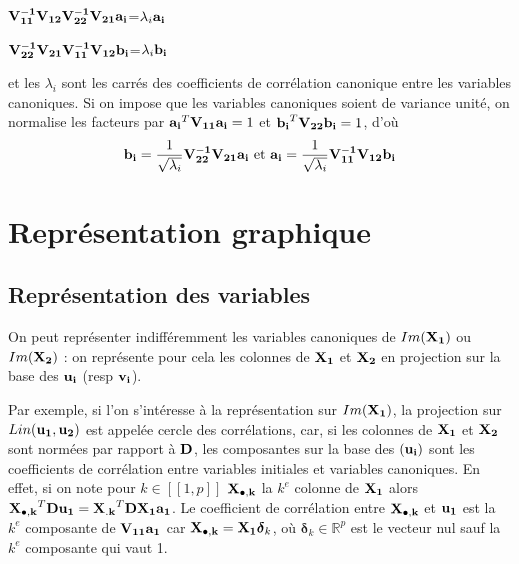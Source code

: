 \documentclass[letterpaper,10pt,french]{sphinxmanual}
\begin{document}
\sphinxAtStartPar
\( {\bf V_{11}^{-1}}{\bf V_{12}}{\bf V_{22}^{-1}}{\bf V_{21}}{\bf a_i}\)=\(\lambda_i {\bf a_i}\)

\sphinxAtStartPar
\( {\bf V_{22}^{-1}}{\bf V_{21}}{\bf V_{11}^{-1}}{\bf V_{12}}{\bf b_i}\)=\(\lambda_i {\bf b_i}\)

\sphinxAtStartPar
et les \(\lambda_i\) sont les carrés des coefficients de corrélation canonique entre les variables canoniques. Si on impose que les variables canoniques soient de variance unité, on normalise les facteurs par \({\bf a_i}^T{\bf V_{11}}{\bf a_i}=1\) et  \({\bf b_i}^T{\bf V_{22}}{\bf b_i}=1\), d’où
\begin{equation*}
\begin{split}{\bf b_i}=\frac{1}{\sqrt{\lambda_i}}{\bf V_{22}^{-1}}{\bf V_{21}}{\bf a_i}\textrm{  et } {\bf a_i}=\frac{1}{\sqrt{\lambda_i}}{\bf V_{11}^{-1}}{\bf V_{12}}{\bf b_i}\end{split}
\end{equation*}

\section{Représentation graphique}
\label{\detokenize{canonique:representation-graphique}}

\subsection{Représentation des variables}
\label{\detokenize{canonique:representation-des-variables}}
\sphinxAtStartPar
On peut représenter indifféremment les variables canoniques de \(Im({\bf {\bf X_1}})\) ou \(Im({\bf {\bf X_2}})\) : on représente pour cela les colonnes de \({\bf X_1}\) et \({\bf X_2}\) en projection sur la base des \({\bf u_i}\) (resp \({\bf v_i}\)).

\sphinxAtStartPar
Par exemple, si l’on s’intéresse à la représentation sur \(Im({\bf {\bf X_1}})\),  la projection sur \(Lin({\bf {\bf u_1}},{\bf {\bf u_2}})\) est appelée cercle des corrélations, car, si les colonnes de \({\bf X_1}\) et \({\bf X_2}\) sont normées par rapport à \({\bf D}\), les composantes sur la base des \(({\bf u_i})\) sont les coefficients de corrélation entre variables initiales et variables canoniques. En effet, si on note pour \(k\in[\![1,p]\!]\) \({\bf X_{\bullet,k}}\) la \(k^e\) colonne de \({\bf X_1}\) alors \({\bf X_{\bullet,k}}^T{\bf D}{\bf {\bf u_1}}={\bf X_{.k}}^T{\bf D}{\bf X_1}{\bf a_1}\). Le coefficient de corrélation entre \({\bf X_{\bullet,k}}\) et \({\bf {\bf u_1}}\) est la \(k^e\) composante de \({\bf V_{11}}{\bf a_1}\) car \({\bf X_{\bullet,k}}={\bf X_1}{\boldsymbol \delta_k}\), où \({\boldsymbol \delta_k}\in\mathbb{R}^p\) est le vecteur nul sauf la \(k^e\) composante qui vaut 1.
\end{document}
